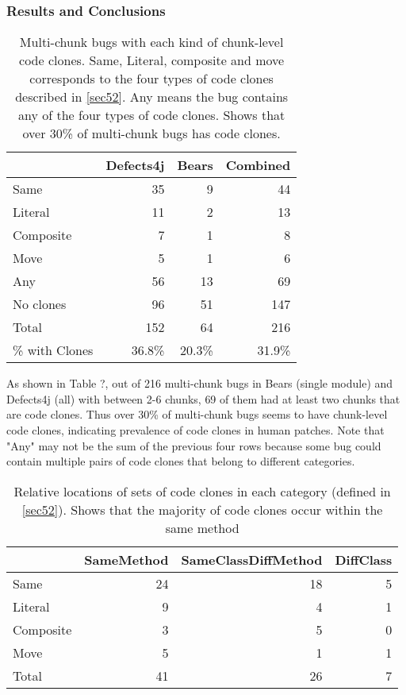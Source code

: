 \documentclass[sigconf, timestamp-false, anonymous=true]{acmart}
\begin{document}
\subsubsection{Results and Conclusions}

\begin{table}
{\begin{center}
\begin{tabular} {| l | r | r | r |}
\hline
& Defects4j & Bears & Combined \\
\hline
Same & 35 & 9 & 44  \\ 
Literal & 11 & 2 & 13  \\
Composite & 7 & 1 & 8  \\
Move & 5 & 1 & 6  \\ \hline
Any & 56 & 13 & 69  \\ \hline
No clones & 96  &  51 & 147 \\ \hline
Total & 152 & 64 & 216 \\ \hline
\% with Clones & 36.8\% & 20.3\% & 31.9\% \\ \hline
\end{tabular}
\end{center}
}
\caption{Multi-chunk bugs with each kind of chunk-level code clones. Same, Literal, composite and move corresponds to
the four types of code clones described in \ref{sec52}. Any means the bug contains any of the four types of code clones. 
Shows that over 30\% of multi-chunk bugs has code clones.}
\end{table}

As shown in Table ?, out of 216 multi-chunk bugs in Bears (single module) and Defects4j (all) with between 2-6 chunks,
69 of them had at least two chunks that are code clones. Thus over 30\% of multi-chunk bugs seems
to have chunk-level code clones, indicating prevalence of code clones in human patches. Note that "Any" may not
be the sum of the previous four rows because some bug could contain multiple pairs of code clones that
belong to different categories.


\begin{table}
{\begin{center}
\begin{tabular} {| l | r | r | r |}
\hline
& SameMethod & SameClassDiffMethod & DiffClass \\
\hline
Same & 24 & 18 & 5  \\ 
Literal & 9 & 4 & 1  \\
Composite & 3 & 5 & 0  \\
Move & 5 & 1 & 1  \\ \hline
Total & 41 & 26 & 7 \\ \hline
\end{tabular}
\end{center}
}
\caption{Relative locations of sets of code clones in each category (defined in \ref{sec52}).
Shows that the majority of code clones occur within the same method}
\end{table}
\end{document}
